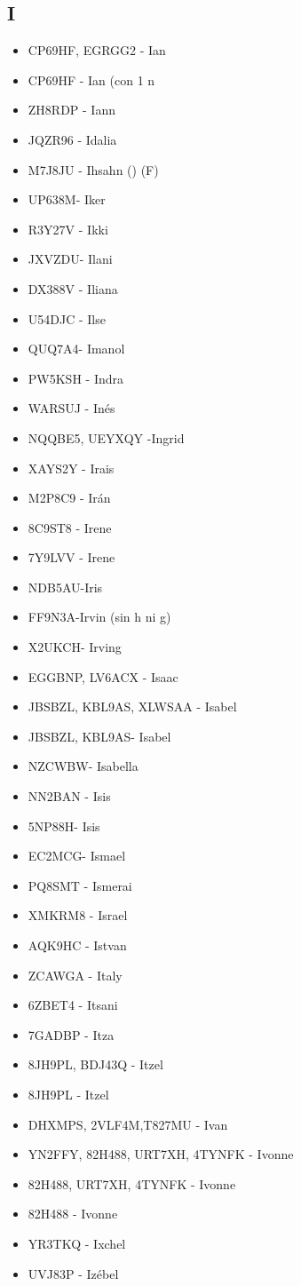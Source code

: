 \subsection*{I}
\begin{itemize}[leftmargin=*,nosep]
\item CP69HF, EGRGG2 - Ian
\item CP69HF - Ian (con 1 n
\item ZH8RDP - Iann
\item JQZR96 - Idalia
\item M7J8JU - Ihsahn () (F)
\item UP638M- Iker
\item R3Y27V - Ikki
\item JXVZDU- Ilani
\item DX388V - Iliana
\item U54DJC - Ilse
\item QUQ7A4- Imanol
\item PW5KSH - Indra
\item WARSUJ - Inés
\item NQQBE5, UEYXQY -Ingrid
\item XAYS2Y - Irais
\item M2P8C9 - Irán
\item 8C9ST8 - Irene
\item 7Y9LVV - Irene
\item NDB5AU-Iris
\item FF9N3A-Irvin (sin h ni g)
\item X2UKCH- Irving
\item EGGBNP, LV6ACX - Isaac
\item JBSBZL, KBL9AS, XLWSAA - Isabel
\item JBSBZL, KBL9AS- Isabel
\item NZCWBW- Isabella
\item NN2BAN - Isis
\item 5NP88H- Isis
\item EC2MCG- Ismael
\item PQ8SMT - Ismerai
\item XMKRM8 - Israel
\item AQK9HC - Istvan
\item ZCAWGA - Italy
\item 6ZBET4 - Itsani
\item 7GADBP - Itza
\item 8JH9PL, BDJ43Q - Itzel
\item 8JH9PL - Itzel
\item DHXMPS, 2VLF4M,T827MU - Ivan
\item YN2FFY, 82H488, URT7XH, 4TYNFK - Ivonne
\item 82H488, URT7XH, 4TYNFK - Ivonne
\item 82H488 - Ivonne
\item YR3TKQ - Ixchel
\item UVJ83P - Izébel
\end{itemize}

